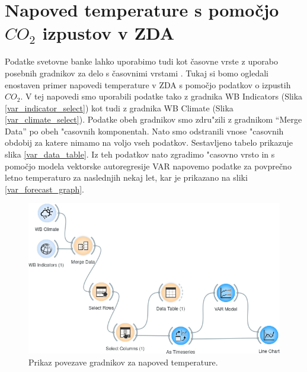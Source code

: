\section{Napoved temperature s pomočjo $CO_2$ izpustov v ZDA}


Podatke svetovne banke lahko uporabimo tudi kot časovne vrste z uporabo
posebnih gradnikov za delo s časovnimi vrstami \cite{time_series}. Tukaj si
bomo ogledali enostaven primer napovedi temperature v ZDA s pomočjo podatkov o
izpustih $CO_2$. V tej napovedi smo uporabili podatke tako z gradnika 
WB Indicators (Slika \ref{var_indicator_select})
kot tudi z gradnika WB Climate (Slika \ref{var_climate_select}). Podatke obeh
gradnikov smo zdru"zili z gradnikom ``Merge Data'' po obeh "casovnih
komponentah. Nato smo odstranili vnose "casovnih obdobij za katere nimamo na
voljo vseh podatkov. Sestavljeno tabelo prikazuje slika \ref{var_data_table}.
Iz teh podatkov nato zgradimo "casovno vrsto in s pomočjo modela vektorske 
autoregresije VAR \cite{var_model} napovemo podatke za povprečno 
letno temperaturo za naslednjih nekaj let, kar je prikazano na sliki 
\ref{var_forecast_graph}.

\begin{figure}
\begin{center}
\includegraphics[width=13.75cm]{pic/var_setup.png}
\end{center}
\caption{Prikaz povezave gradnikov za napoved temperature.}
\label{var_setup}
\end{figure} 


